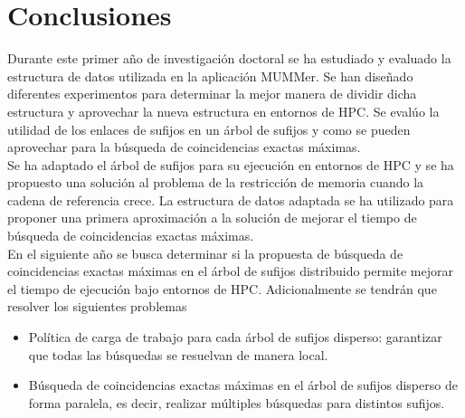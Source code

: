 \documentclass[12pt,a4paper]{article}
\begin{document}
\section{Conclusiones}
\indent
Durante este primer año de investigación doctoral se ha estudiado y evaluado la estructura de datos utilizada en la aplicación MUMMer.
Se han diseñado diferentes experimentos para determinar la mejor manera de dividir dicha estructura y aprovechar la nueva estructura
en entornos de HPC. Se evalúo la utilidad de los enlaces de sufijos en un árbol de sufijos y como se pueden aprovechar para la 
búsqueda de coincidencias exactas máximas.\\
\indent
Se ha adaptado el árbol de sufijos para su ejecución en entornos de HPC y se ha propuesto una solución al problema de  la restricción
de memoria cuando la cadena de referencia crece. La estructura de datos adaptada se ha utilizado para proponer una primera aproximación a la 
solución de mejorar el tiempo de búsqueda de coincidencias exactas máximas.\\
\indent
En el siguiente año se busca determinar si la propuesta de búsqueda de coincidencias exactas máximas en el árbol de sufijos distribuido 
permite mejorar el tiempo de ejecución bajo entornos de HPC. Adicionalmente se tendrán que resolver los siguientes problemas
\begin{itemize}
  \item Política de carga de trabajo para cada árbol de sufijos disperso: garantizar que todas las búsquedas se resuelvan de manera local.
  \item Búsqueda de coincidencias exactas máximas en el árbol de sufijos disperso de forma paralela, es decir, realizar múltiples búsquedas
    para distintos sufijos. 
\end{itemize}
 
	
\end{document}
